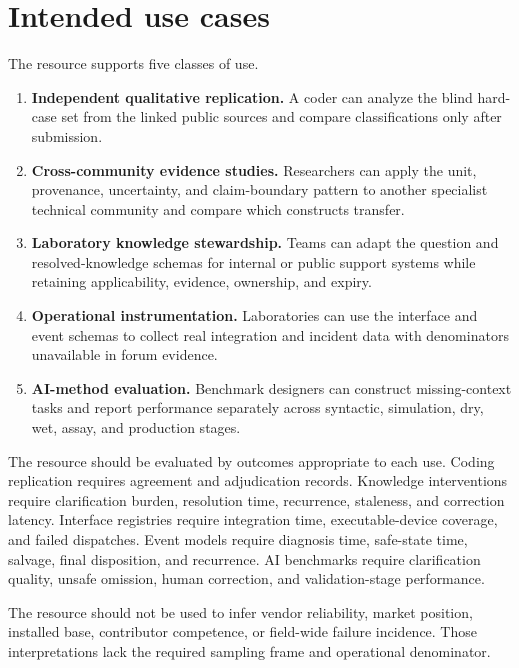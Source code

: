 \section{Intended use cases}

The resource supports five classes of use.

\begin{enumerate}
  \item \textbf{Independent qualitative replication.} A coder can analyze the blind hard-case set from the linked public sources and compare classifications only after submission.
  \item \textbf{Cross-community evidence studies.} Researchers can apply the unit, provenance, uncertainty, and claim-boundary pattern to another specialist technical community and compare which constructs transfer.
  \item \textbf{Laboratory knowledge stewardship.} Teams can adapt the question and resolved-knowledge schemas for internal or public support systems while retaining applicability, evidence, ownership, and expiry.
  \item \textbf{Operational instrumentation.} Laboratories can use the interface and event schemas to collect real integration and incident data with denominators unavailable in forum evidence.
  \item \textbf{AI-method evaluation.} Benchmark designers can construct missing-context tasks and report performance separately across syntactic, simulation, dry, wet, assay, and production stages.
\end{enumerate}

The resource should be evaluated by outcomes appropriate to each use. Coding replication requires agreement and adjudication records. Knowledge interventions require clarification burden, resolution time, recurrence, staleness, and correction latency. Interface registries require integration time, executable-device coverage, and failed dispatches. Event models require diagnosis time, safe-state time, salvage, final disposition, and recurrence. AI benchmarks require clarification quality, unsafe omission, human correction, and validation-stage performance.

The resource should not be used to infer vendor reliability, market position, installed base, contributor competence, or field-wide failure incidence. Those interpretations lack the required sampling frame and operational denominator.
